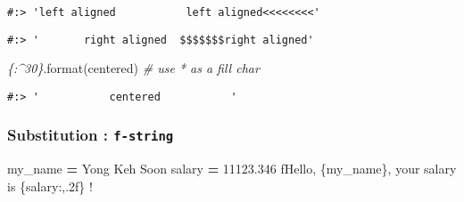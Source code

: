 \documentclass[
]{book}
\newenvironment{Shaded}{\begin{snugshade}}{\end{snugshade}}
\newcommand{\BuiltInTok}[1]{#1}
\newcommand{\CommentTok}[1]{\textcolor[rgb]{0.37,0.37,0.37}{\textit{#1}}}
\newcommand{\FloatTok}[1]{\textcolor[rgb]{0.06,0.06,0.06}{#1}}
\newcommand{\NormalTok}[1]{#1}
\newcommand{\OperatorTok}[1]{\textcolor[rgb]{0.43,0.43,0.43}{\textbf{#1}}}
\newcommand{\SpecialCharTok}[1]{\textcolor[rgb]{0,0,0}{#1}}
\newcommand{\SpecialStringTok}[1]{\textcolor[rgb]{0.5,0.5,0.5}{#1}}
\newcommand{\StringTok}[1]{\textcolor[rgb]{0.5,0.5,0.5}{#1}}
\begin{document}
\begin{verbatim}
#:> 'left aligned           left aligned<<<<<<<<'
\end{verbatim}

\begin{Shaded}
\end{Shaded}

\begin{verbatim}
#:> '       right aligned  $$$$$$$right aligned'
\end{verbatim}

\begin{Shaded}
\begin{Highlighting}[]
\CommentTok{\textquotesingle{}\{:\^{}30\}\textquotesingle{}}\NormalTok{.}\BuiltInTok{format}\NormalTok{(}\StringTok{\textquotesingle{}centered\textquotesingle{}}\NormalTok{)  }\CommentTok{\# use \textquotesingle{}*\textquotesingle{} as a fill char}
\end{Highlighting}
\end{Shaded}

\begin{verbatim}
#:> '           centered           '
\end{verbatim}

\hypertarget{substitution-f-string}{%
\subsubsection{\texorpdfstring{Substitution : \textbf{\texttt{f-string}}}{Substitution : f-string}}\label{substitution-f-string}}

\begin{Shaded}
\begin{Highlighting}[]
\NormalTok{my\_name }\OperatorTok{=} \StringTok{\textquotesingle{}Yong Keh Soon\textquotesingle{}}
\NormalTok{salary  }\OperatorTok{=} \FloatTok{11123.346}
\SpecialStringTok{f\textquotesingle{}Hello, }\SpecialCharTok{\{}\NormalTok{my\_name}\SpecialCharTok{\}}\SpecialStringTok{, your salary is }\SpecialCharTok{\{}\NormalTok{salary}\SpecialCharTok{:,}\FloatTok{.2}\SpecialCharTok{f\}}\SpecialStringTok{ !\textquotesingle{}}
\end{Highlighting}
\end{Shaded}
\end{document}
